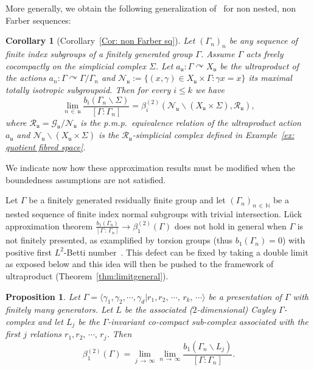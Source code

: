 \documentclass[10pt]{amsart}
\newtheorem{prop}[cdrthm]{Proposition}
\newtheorem{coro}[cdrthm]{Corollary}
\theoremstyle{definition}
\newcommand{\Nmath}{\mathbb{N}}
\newcommand{\acting}{\curvearrowright}
\newcommand{\RR}{\mathcal{R}}
\newcommand{\cn}{\mathcal{N}}
\newcommand{\cg}{\mathcal{G}}
\newcommand{\ul}{\mathfrak{u}}
\newcommand{\pmp}{p.m.p.\ }
\begin{document}
More generally, we obtain the following generalization of~\cite[Theorem~3.1]{berggab} for non nested, non Farber sequences:
\begin{coro}[Corollary~\ref{Cor: non Farber sq}]
Let $(\Gamma_n)_n$ be any sequence of finite index subgroups of a finitely generated group $\Gamma$. Assume $\Gamma$ acts freely cocompactly on the simplicial complex $\Sigma$. Let $a_{\ul}:\Gamma\acting X_{\ul}$ be the ultraproduct of the actions $a_n:\Gamma\acting \Gamma/\Gamma_n$ and $\cn_\ul:=\{(x,\gamma)\in X_{\ul}\times \Gamma: \gamma x=x\} $ its maximal totally isotropic subgroupoid. Then for every $i\leq k$ we have
\[
\lim\limits_{n\,\in\,\ul}\frac{b_i(\Gamma_n\backslash \Sigma)}{[\Gamma:\Gamma_n]}=\beta^{(2)}_i(\cn_\ul \backslash \left(X_{\ul}\times \Sigma\right),\RR_\ul),
\]
where $\RR_\ul=\cg_\ul/\cn_\ul$ is the \pmp equivalence relation of the ultraproduct action $a_\ul$ and $\cn_\ul \backslash \left(X_{\ul}\times \Sigma\right)$ is the $\RR_{\ul}$-simplicial complex defined in Example~\ref{ex: quotient fibred space}.
\end{coro}


We indicate now how these approximation results must be modified when the boundedness assumptions are not satisfied.

Let $\Gamma$ be a finitely generated residually finite group and let $(\Gamma_n)_{n\,\in\,\Nmath}$ be a nested sequence of finite index normal subgroups with trivial intersection. Lück approximation theorem $\frac{b_1(\Gamma_n)}{[\Gamma\,:\,\Gamma_n]} \to \beta_1^{(2)}(\Gamma)$ does not hold in general when $\Gamma$ is not finitely presented, as examplified by torsion groups (thus $b_1(\Gamma_n)=0$) with positive first $L^2$-Betti number~\cite{Lueck-Osin-2011}. This defect can be fixed by taking a double limit as exposed below and this idea will then be pushed to the framework of ultraproduct (Theorem~\ref{thm:limitgeneral}).
\begin{prop}
Let $\Gamma=\langle \gamma_1, \gamma_2, \cdots, \gamma_d\vert r_1, r_2,\,\cdots,\,r_k,\,\cdots\rangle$ be a presentation of $\Gamma$ with finitely many generators. Let $L$ be the associated ($2$-dimensional) Cayley $\Gamma$-complex and let $L_j$ be the $\Gamma$-invariant co-compact sub-complex associated with the first $j$ relations $ r_1, r_2,\,\cdots,\,r_j$. Then
\[
\beta_1^{(2)}(\Gamma)=
\lim\limits_{j\,\to\,\infty}
\lim\limits_{n\,\to\,\infty}
\frac{b_1(\Gamma_n\backslash L_j)}{[\Gamma:\Gamma_n]}.
\]
\end{prop}
\end{document}
